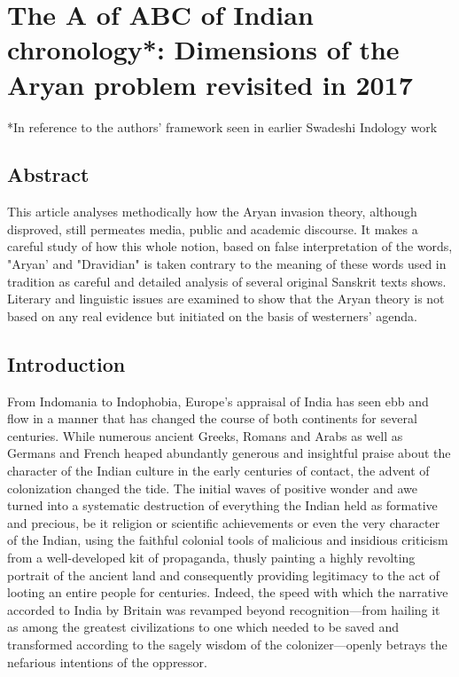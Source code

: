 
\chapter{The A of ABC of Indian chronology*: Dimensions of the Aryan problem revisited in 2017}\label{chapter2}


*In reference to the authors’ framework seen in earlier Swadeshi Indology work

\section*{Abstract}

This article analyses methodically how the Aryan invasion theory, although disproved, still permeates media, public and academic discourse. It makes a careful study of how this whole notion, based on false interpretation of the words, "Aryan' and "Dravidian" is taken contrary to the meaning of these words used in tradition as careful and detailed analysis of several original Sanskrit texts shows. Literary and linguistic issues are examined to show that the Aryan theory is not based on any real evidence but initiated on the basis of westerners' agenda.


\section{Introduction}

From Indomania to Indophobia, Europe’s appraisal of India has seen ebb and flow in a manner that has changed the course of both continents for several centuries. While numerous ancient Greeks, Romans and Arabs as well as Germans and French heaped abundantly generous and insightful praise about the character of the Indian culture in the early centuries of contact, the advent of colonization changed the tide. The initial waves of positive wonder and awe turned into a systematic destruction of everything the Indian held as formative and precious, be it religion or scientific achievements or even the very character of the Indian, using the faithful colonial tools of malicious and insidious criticism from a well-developed kit of propaganda, thusly painting a highly revolting portrait of the ancient land and consequently providing legitimacy to the act of looting an entire people for centuries. Indeed, the speed with which the narrative accorded to India by Britain was revamped beyond recognition—from hailing it as among the greatest civilizations to one which needed to be saved and transformed according to the sagely wisdom of the colonizer—openly betrays the nefarious intentions of the oppressor.

